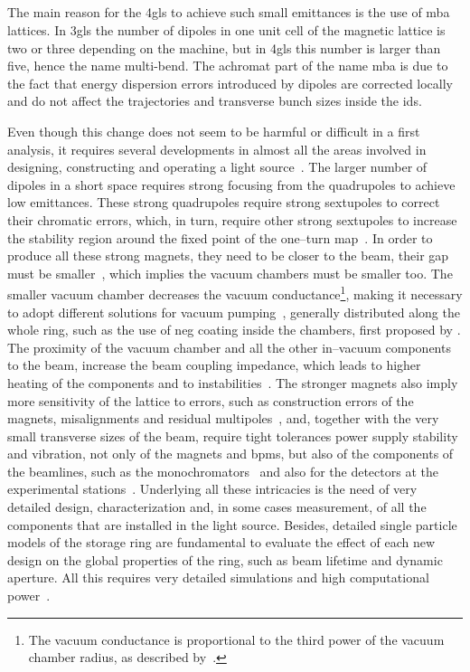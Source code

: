 \subsection{}

    The main reason for the \gls{4gls} to achieve such small emittances is the use of \gls{mba} lattices. In \gls{3gls} the number of dipoles in one unit cell of the magnetic lattice is two or three depending on the machine, but in \gls{4gls} this number is larger than five, hence the name multi-bend. The achromat part of the name \gls{mba} is due to the fact that energy dispersion errors introduced by dipoles are corrected locally and do not affect the trajectories and transverse bunch sizes inside the \glspl{id}.

    Even though this change does not seem to be harmful or difficult in a first analysis, it requires several developments in almost all the areas involved in designing, constructing and operating a light source~\cite{Eriksson2014,Liu2017}. The larger number of dipoles in a short space requires strong focusing from the quadrupoles to achieve low emittances. These strong quadrupoles require strong sextupoles to correct their chromatic errors, which, in turn, require other strong sextupoles to increase the stability region around the fixed point of the one--turn map~\cite{Borland2014}. In order to produce all these strong magnets, they need to be closer to the beam, their gap must be smaller~\cite{Johansson2014}, which implies the vacuum chambers must be smaller too. The smaller vacuum chamber decreases the vacuum conductance\footnote{The vacuum conductance is proportional to the third power of the vacuum chamber radius, as described by~.}, making it necessary to adopt different solutions for vacuum pumping~\cite{Al-Dmour2014}, generally distributed along the whole ring, such as the use of \gls{neg} coating inside the chambers, first proposed by .
    The proximity of the vacuum chamber and all the other in--vacuum components to the beam, increase the beam coupling impedance, which leads to higher heating of the components and to instabilities~\cite{Nagaoka2014}. The stronger magnets also imply more sensitivity of the lattice to errors, such as construction errors of the magnets, misalignments and residual multipoles~\cite{Neuenschwander2015,Hettel2014}, and, together with the very small transverse sizes of the beam, require tight tolerances power supply stability and vibration, not only of the magnets and \glspl{bpm}, but also of the components of the beamlines, such as the monochromators~\cite{Susini2014,Siewert2014} and also for the detectors at the experimental stations~\cite{Denes2014}. Underlying all these intricacies is the need of very detailed design, characterization and, in some cases measurement, of all the components that are installed in the light source. Besides, detailed single particle models of the storage ring are fundamental to evaluate the effect of each new design on the global properties of the ring, such as beam lifetime and dynamic aperture. All this requires very detailed simulations and high computational power~\cite{Borland2014}.

